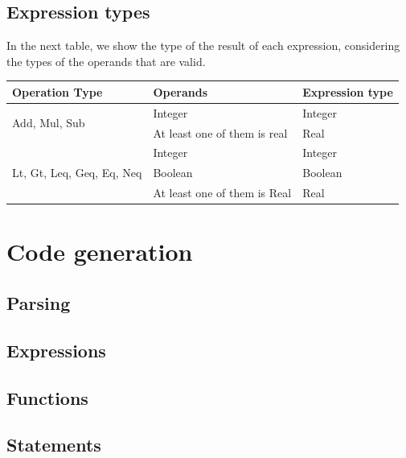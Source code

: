\documentclass[12pt]{article}
\begin{document}
\subsection{Expression types}

In the next table, we show the type of the result of each expression, considering the types of the operands that are valid. \\

\begin{tabularx} {\textwidth} {|X|X|X|} 
 \textbf{Operation Type} 	& \textbf{Operands} & \textbf{Expression type} \\ \hline
	\multirow{2}{*}{Add, Mul, Sub} 	& Integer & Integer \\ 
									& At least one of them is real & Real \\ \hline
	\multirow{3}{*}{Lt, Gt, Leq, Geq, Eq, Neq} 	& Integer & Integer \\
												& Boolean & Boolean \\
												& At least one of them is Real & Real \\ \hline


\end{tabularx}

\newpage

\section{Code generation}

\subsection{Parsing}

\subsection{Expressions}

\subsection{Functions}

\subsection{Statements}
\end{document}
